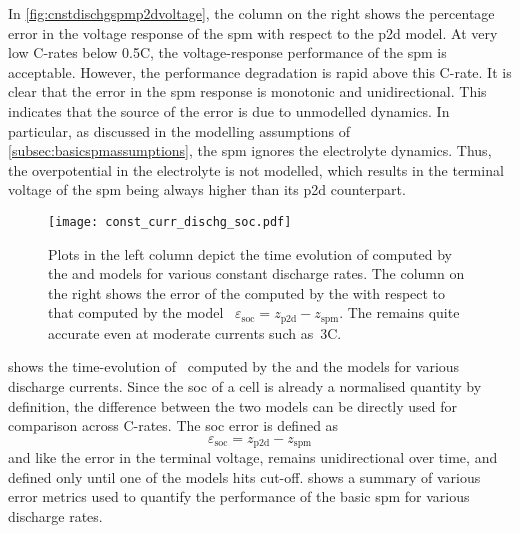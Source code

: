 In  \cref{fig:cnstdischgspmp2dvoltage},  the  column  on  the  right  shows  the
percentage error  in the voltage response  of the \gls{spm} with  respect to the
\gls{p2d} model.  At very  low C-rates  below \approx0.5C,  the voltage-response
performance of the \gls{spm} is acceptable. However, the performance degradation
is rapid above this C-rate. It is clear that the error in the \gls{spm} response
is monotonic and unidirectional. This indicates  that the source of the error is
due  to  unmodelled dynamics.  In  particular,  as  discussed in  the  modelling
assumptions  of  \cref{subsec:basicspmassumptions},  the \gls{spm}  ignores  the
electrolyte  dynamics.  Thus,  the  overpotential  in  the  electrolyte  is  not
modelled, which  results in the terminal  voltage of the \gls{spm}  being always
higher than its \gls{p2d} counterpart.

\begin{figure}[!htb]
    \centering
    \texttt{[image: const\_curr\_dischg\_soc.pdf]}
    \caption[ computed by  and
     models for constant current discharge]{Plots in the left
        column depict the time evolution of  computed by the
         and  models for various constant
        discharge rates. The column on the right shows the error of the
         computed by the  with respect to that
        computed by the  model \ie~$ \varepsilon_\text{soc}
        = {z_\text{p2d}} - z_\text{spm} $. The  remains quite
    accurate even at moderate currents such as~3C.}
    \label{fig:cnstdischgspmp2dsoc}
\end{figure}

  shows  the  time-evolution  of~
computed by the   and the   models for various
discharge  currents. Since  the  \gls{soc} of  a cell  is  already a  normalised
quantity by  definition, the difference between  the two models can  be directly
used for comparison across C-rates. The \gls{soc} error is defined as
\begin{equation}
    \varepsilon_\text{soc} = {z_\text{p2d}} - z_\text{spm}
\end{equation}
and   like  the   error  in   the  terminal   voltage,  remains   unidirectional
over  time,   and  defined  only   until  one   of  the  models   hits  cut-off.
  shows  a  summary of  various  error
metrics used  to quantify  the performance  of the  basic \gls{spm}  for various
discharge rates.


